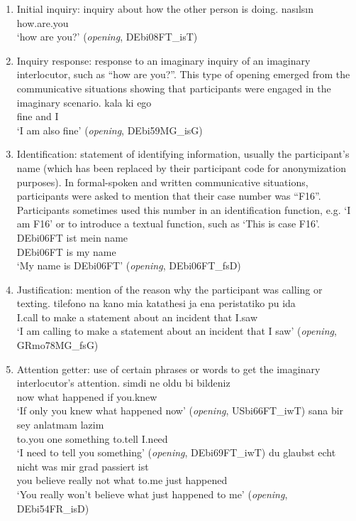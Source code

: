 \documentclass[output=paper,colorlinks,citecolor=brown]{langscibook}
\begin{document}
\begin{enumerate}[label=(\alph*)]
    \item Initial inquiry: inquiry about how the other person is doing. 
\ea \label{katsikaetal:fivegreeting}
\gll nasılsın\\
     how.are.you\\
\glt `how are you?' (\textit{opening}, DEbi08FT\_isT) 
\z

    \item Inquiry response: response to an imaginary inquiry of an imaginary interlocutor, such as “how are you?”. This type of opening emerged from the communicative situations showing that participants were engaged in the imaginary scenario. 
\ea \label{katsikaetal:sixinqresponse}
\gll kala ki ego\\
     fine and I\\
\glt `I am also fine' (\textit{opening}, DEbi59MG\_isG) 
\z

    \item Identification: statement of identifying information, usually the participant’s name (which has been replaced by their participant code for anonymization purposes). In formal-spoken and written communicative situations, participants were asked to mention that their case number was “F16”. Participants sometimes used this number in an identification function, e.g. ‘I am F16’ or to introduce a textual function, such as ‘This is case F16’. 
\ea \label{katsikaetal:sevenidentification}
\gll DEbi06FT  ist mein name\\
     DEbi06FT  is  my   name\\
\glt `My name is DEbi06FT' (\textit{opening}, DEbi06FT\_fsD) 
\z

  \item Justification: mention of the reason why the participant was calling or texting. 
\ea \label{katsikaetal:eightjustification}
\gll tilefono na kano mia katathesi ja ena peristatiko pu ida\\
     I.call to make a statement about an incident that I.saw\\
\glt `I am calling to make a statement about an incident that I saw' (\textit{opening}, GRmo78MG\_fsG) 
\z
\pagebreak
\item Attention getter: use of certain phrases or words to get the imaginary interlocutor’s attention.  
\ea \label{katsikaetal:nineattention}
\gll simdi  ne    oldu     bi   bildeniz\\
     now    what  happened if   you.knew\\
\glt `If only you knew what happened now' (\textit{opening}, USbi66FT\_iwT) 
\ex \label{katsikaetal:tenattention}
\gll sana    bir  sey        anlatmam  lazim\\
     to.you  one  something  to.tell   I.need\\
\glt `I need to tell you something' (\textit{opening}, DEbi69FT\_iwT) 
\ex \label{katsikaetal:elevenattention}
\gll du  glaubst echt    nicht  was   mir   grad  passiert ist \\
     you believe really  not    what  to.me just  happened\\
\glt `You really won't believe what just happened to me' (\textit{opening}, DEbi54FR\_isD) 
\z


\end{enumerate}
\end{document}
